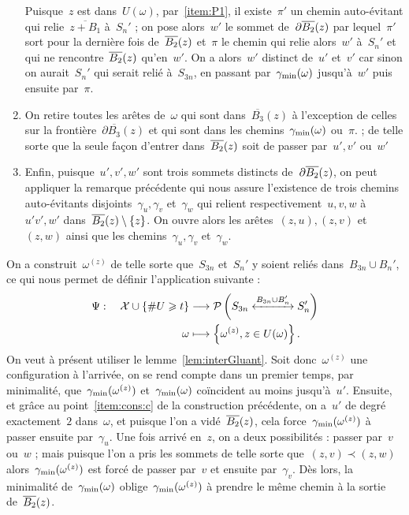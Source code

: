 \begin{dem}
\begin{enumerate}
					Puisque~$z$ est dans~$U(\omega)$, par~\ref{item:P1}, il existe~$\pi'$ un chemin auto-évitant qui relie~$\overline{z+B_1}$ à~$S_n'$ ; on pose alors~$w'$  le sommet de~$\partial\BRz$ par lequel~$\pi'$ sort pour la dernière fois de~$\BRz$ et~$\pi$\marginnote{$\pi$} le chemin qui relie alors~$w'$ à~$S_n'$ et qui ne rencontre~$\BRz$ qu'en~$w'$. On a alors~$w'$ distinct de~$u'$ et~$v'$ car sinon on aurait~$S_n'$ qui serait relié à~$S_{3n}$, en passant par~$\Cmin$ jusqu'à~$w'$ puis ensuite par~$\pi$.
					\item\label{item:cons:c} On retire toutes les arêtes de~$\omega$ qui sont dans~$\overline{B_3}(z)$ à l'exception de celles sur la frontière~$\partial\overline{B_3}(z)$ et qui sont dans les chemins~$\Cmin$ ou~$\pi$. ; de telle sorte que la seule façon d'entrer dans~$\BRz$ soit de passer par~$u', v'$ ou~$w'$
					\item\label{item:cons:d} Enfin, puisque~$u',v',w'$ sont trois sommets distincts de~$\partial\BRz$, on peut appliquer la remarque précédente qui nous assure l'existence de trois chemins auto-évitants disjoints~$\gamma_u,\gamma_v$ et~$\gamma_w$  qui relient respectivement~$u,v,w$ à~$u'v',w'$ dans~$\BRz\priv\{z\}$.  On ouvre alors les arêtes~$(z,u), (z,v)$ et~$(z,w)$ ainsi que les chemins~$\gamma_u,\gamma_v$ et~$\gamma_w$.
				\end{enumerate}
				On a construit~$\omega^{(z)}$ de telle sorte que~$S_{3n}$ et~$S_n'$ y soient reliés dans~$B_{3n}\cup B_n'$, ce qui nous permet de définir l'application suivante :
				\begin{align*}
					\Psi : \quad \mathcal{X} \cup \{\# U \geq t\} 	& \longrightarrow 
							\mathcal{P}\left(
								\relie[B_{3n}\cup B_n']{S_{3n}}{S_n'}		
							\right)\\
								\omega	& \longmapsto  \left\{\omega^{(z)}, z\in U(\omega)\right\}.
				\end{align*}
				On veut à présent utiliser le lemme~\ref{lem:interGluant}. Soit donc~$\omega^{(z)}$ une configuration à l'arrivée, on se rend compte dans un premier temps, par minimalité, que~$\Cmin[\omega^{(z)}]$ et~$\Cmin$ coïncident au moins jusqu'à~$u'$. Ensuite, et grâce au point~\ref{item:cons:c} de la construction précédente, on a~$u'$ de degré exactement~$2$ dans~$\omega$, et puisque l'on a vidé~$\BRz$, cela force~$\Cmin[\omega^{(z)}]$ à passer ensuite par~$\gamma_u$. Une fois arrivé en~$z$, on a deux possibilités : passer par~$v$ ou~$w$ ; mais puisque l'on a pris les sommets de telle sorte que~$(z,v)\prec (z,w)$ alors~$\Cmin[\omega^{(z)}]$ est forcé de passer par~$v$ et ensuite par~$\gamma_v$. Dès lors, la minimalité de~$\Cmin$ oblige~$\Cmin[\omega^{(z)}]$ à prendre le même chemin à la sortie de~$\BRz$.
				

\end{dem}
